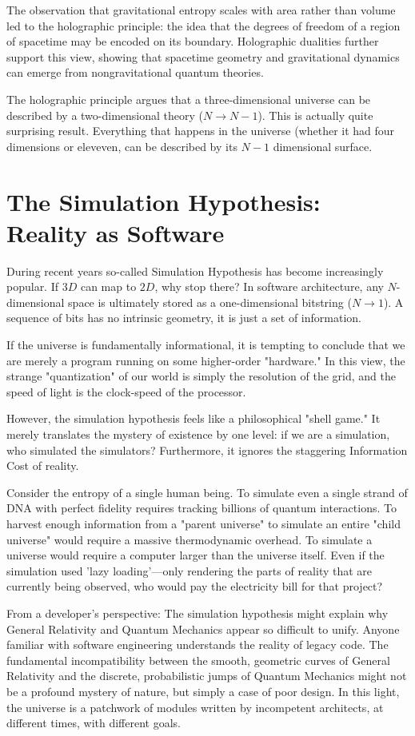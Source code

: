 The observation that gravitational entropy scales with area rather than volume led to the holographic principle: the idea that the degrees of freedom of a region of spacetime may be encoded on its boundary. Holographic dualities further support this view, showing that spacetime geometry and gravitational dynamics can emerge from nongravitational quantum theories.

The holographic principle argues that a three-dimensional universe can be described by a two-dimensional theory ($N \rightarrow N-1$). This is actually quite surprising result.
Everything that happens in the universe (whether it had four dimensions or eleveven, can be described by its $N-1$ dimensional surface. 


\section{The Simulation Hypothesis: Reality as Software}

During recent years so-called Simulation Hypothesis has become increasingly popular. If $3D$ can map to $2D$, why stop there? In software architecture, any $N$-dimensional space is ultimately stored as a one-dimensional bitstring ($N \rightarrow 1$). A sequence of bits has no intrinsic geometry, it is just a set of information.

If the universe is fundamentally informational, it is tempting to conclude that we are merely a program running on some higher-order "hardware." In this view, the strange "quantization" of our world is simply the resolution of the grid, and the speed of light is the clock-speed of the processor.

However, the simulation hypothesis feels like a philosophical "shell game." It merely translates the mystery of existence by one level: if we are a simulation, who simulated the simulators? Furthermore, it ignores the staggering Information Cost of reality.

Consider the entropy of a single human being. To simulate even a single strand of DNA with perfect fidelity requires tracking billions of quantum interactions. To harvest enough information from a "parent universe" to simulate an entire "child universe" would require a massive thermodynamic overhead.
To simulate a universe would require a computer larger than the universe itself. Even if the simulation used 'lazy loading'—only rendering the parts of reality that are currently being observed, who would pay the electricity bill for that project?

From a developer's perspective: The simulation hypothesis might explain why General Relativity and Quantum Mechanics appear so difficult to unify. Anyone familiar with software engineering understands the reality of legacy code. The fundamental incompatibility between the smooth, geometric curves of General Relativity and the discrete, probabilistic jumps of Quantum Mechanics might not be a profound mystery of nature, but simply a case of poor design. In this light, the universe is a patchwork of modules written by incompetent architects, at different times, with different goals.
